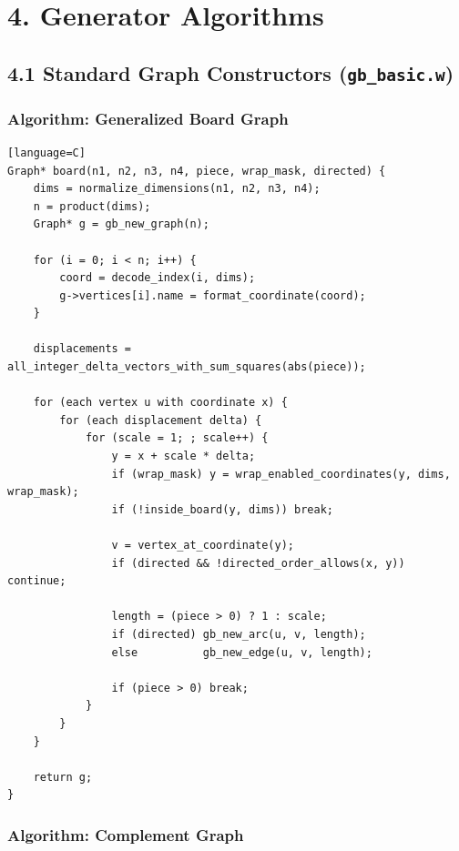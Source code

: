 \documentclass[11pt]{article}
\begin{document}
\section{4. Generator Algorithms}\label{generator-algorithms}

\subsection{\texorpdfstring{4.1 Standard Graph Constructors (\texttt{gb\_basic.w})}{4.1 Standard Graph Constructors (gb\_basic.w)}}\label{standard-graph-constructors-gb_basic.w}

\subsubsection{Algorithm: Generalized Board Graph}\label{algorithm-generalized-board-graph}

\begin{verbatim}[language=C]
Graph* board(n1, n2, n3, n4, piece, wrap_mask, directed) {
    dims = normalize_dimensions(n1, n2, n3, n4);
    n = product(dims);
    Graph* g = gb_new_graph(n);

    for (i = 0; i < n; i++) {
        coord = decode_index(i, dims);
        g->vertices[i].name = format_coordinate(coord);
    }

    displacements = all_integer_delta_vectors_with_sum_squares(abs(piece));

    for (each vertex u with coordinate x) {
        for (each displacement delta) {
            for (scale = 1; ; scale++) {
                y = x + scale * delta;
                if (wrap_mask) y = wrap_enabled_coordinates(y, dims, wrap_mask);
                if (!inside_board(y, dims)) break;

                v = vertex_at_coordinate(y);
                if (directed && !directed_order_allows(x, y)) continue;

                length = (piece > 0) ? 1 : scale;
                if (directed) gb_new_arc(u, v, length);
                else          gb_new_edge(u, v, length);

                if (piece > 0) break;
            }
        }
    }

    return g;
}
\end{verbatim}

\subsubsection{Algorithm: Complement Graph}\label{algorithm-complement-graph}
\end{document}
